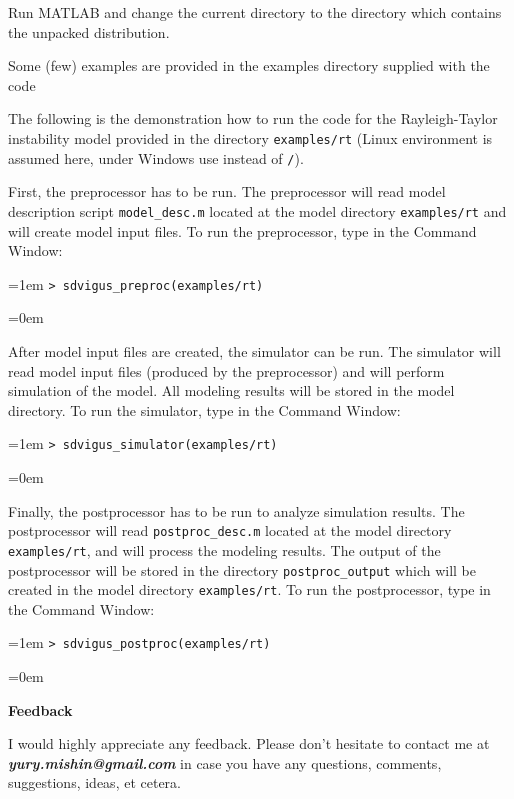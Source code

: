 \documentclass[a4paper,onesided,12pt]{letter}
\begin{document}
\begin{list}{}{\leftmargin=1em}
Run MATLAB and change the current directory to the directory which contains the unpacked distribution.

    Some (few) examples are provided in the examples directory
    supplied with the code

The following is the demonstration how to run the code for the Rayleigh-Taylor instability model provided in the directory \texttt{examples/rt} (Linux environment is assumed here, under Windows use \texttt{} instead of \texttt{/}).

First, the preprocessor has to be run. The preprocessor will read model description script \texttt{model\_desc.m} located at the model directory \texttt{examples/rt} and will create model input files. To run the preprocessor, type in the Command Window:

\leftskip=1em \texttt{\textgreater\ sdvigus\_preproc(\textquotesingle examples/rt\textquotesingle)}

\leftskip=0em

After model input files are created, the simulator can be run. The simulator will read model input files (produced by the preprocessor) and will perform simulation of the model. All modeling results will be stored in the model directory. To run the simulator, type in the Command Window:

\leftskip=1em \texttt{\textgreater\ sdvigus\_simulator(\textquotesingle examples/rt\textquotesingle)}

\leftskip=0em

Finally, the postprocessor has to be run to analyze simulation results. The postprocessor will read \texttt{postproc\_desc.m} located at the model directory \texttt{examples/rt}, and will process the modeling results. The output of the postprocessor will be stored in the directory \texttt{postproc\_output} which will be created in the model directory \texttt{examples/rt}. To run the postprocessor, type in the Command Window:

\leftskip=1em \texttt{\textgreater\ sdvigus\_postproc(\textquotesingle examples/rt\textquotesingle)}

\leftskip=0em

\item \textbf{Feedback}

I would highly appreciate any feedback. Please don't hesitate to contact me at \textsl{\textbf{yury.mishin@gmail.com}} in case you have any questions, comments, suggestions, ideas, et cetera.

\end{list}
\end{document}
